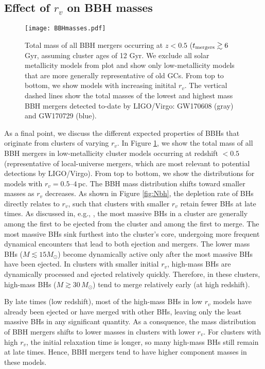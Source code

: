 \documentclass[twocolumn,tighten]{aastex63}
\begin{document}
\subsection{Effect of $r_v$ on BBH masses}
\label{sec:BBH_properties}

\begin{figure}
\begin{center}
\texttt{[image: BBHmasses.pdf]}
\caption{\footnotesize \label{fig:BBH_total_mass} Total mass of all BBH mergers occurring at $z<0.5$ ($t_{\rm{mergers}}\gtrsim6\,$Gyr, assuming cluster ages of 12 Gyr. We exclude all solar metallicity models from plot and show only low-metallicity models that are more generally representative of old GCs. From top to bottom, we show models with increasing initital $r_v$. The vertical dashed lines show the total masses of the lowest and highest mass BBH mergers detected to-date by LIGO/Virgo: GW170608 (gray) and GW170729 (blue).}
\end{center}
\end{figure}

As a final point, we discuss the different expected properties of BBHs that originate from clusters of varying $r_v$. In Figure \ref{fig:BBH_total_mass}, we show the total mass of all BBH mergers in low-metallicity cluster models occurring at redshift $<0.5$ (representative of local-universe mergers, which are most relevant to potential detections by LIGO/Virgo). From top to bottom, we show the distributions for models with $r_v=0.5$--$4\,$pc. The BBH mass distribution shifts toward smaller masses as $r_v$ decreases. As shown in Figure \ref{fig:Nbh}, the depletion rate of BHs directly relates to $r_v$, such that clusters with smaller $r_v$ retain fewer BHs at late times. As discussed in, e.g., \citet{Morscher2015}, the most massive BHs in a cluster are generally among the first to be ejected from the cluster and among the first to merge. The most massive BHs sink furthest into the cluster's core, undergoing more frequent dynamical encounters that lead to both ejection and mergers. The lower mass BHs ($M \lesssim 15 M_{\odot}$) become dynamically active only after the most massive BHs have been ejected. In clusters with smaller initial $r_v$, high-mass BHs are dynamically processed and ejected relatively quickly. Therefore, in these clusters, high-mass BHs ($M \gtrsim 30\,M_{\odot}$) tend to merge relatively early (at high redshift).

By late times (low redshift), most of the high-mass BHs in low $r_v$ models have already been ejected or have merged with other BHs, leaving only the least massive BHs in any significant quantity. As a consquence, the mass distribution of BBH mergers shifts to lower masses in clusters with lower $r_v$. For clusters with high $r_v$, the initial relaxation time is longer, so many high-mass BHs still remain at late times. Hence, BBH mergers tend to have higher component masses in these models.
\end{document}
